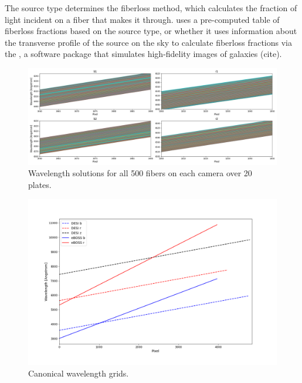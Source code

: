 The source type determines the fiberloss method, which calculates the fraction of light incident on a fiber that makes it through. uses a pre-computed table of fiberloss fractions based on the source type, or whether it uses information about the transverse profile of the source on the sky to calculate fiberloss fractions via the , a software package that simulates high-fidelity images of galaxies (cite).


\begin{figure}[h]
\centering
\includegraphics[width=16cm]{images/specsim/wlen_soln.png}
\caption{Wavelength solutions for all 500 fibers on each camera over 20 plates.}
\label{fig:wavelength_solutions}
\end{figure}


\begin{figure}[h]
\centering
\includegraphics[width=14cm]{images/specsim/canonical_grid.png}
\caption{Canonical wavelength grids.}
\label{fig:canonical}
\end{figure}


